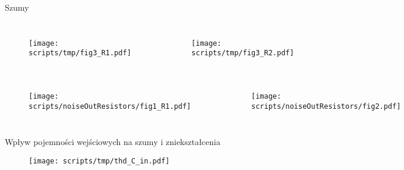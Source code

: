 \begin{frame}{Szumy}
    \begin{columns}
        \begin{figure}[H]
            \centering
            \texttt{[image: scripts/tmp/fig3\_R1.pdf]}
        \end{figure}
        \begin{figure}[H]
            \centering
            \texttt{[image: scripts/tmp/fig3\_R2.pdf]}
        \end{figure}
    \end{columns}


    \begin{columns}
        \begin{figure}[H]
            \centering
            \texttt{[image: scripts/noiseOutResistors/fig1\_R1.pdf]}
        \end{figure}
        \begin{figure}[H]
            \centering
            \texttt{[image: scripts/noiseOutResistors/fig2.pdf]}
        \end{figure}
    \end{columns}


\end{frame}


\begin{frame}{Wpływ pojemności wejściowych na szumy i zniekształcenia}
    \begin{figure}[H]
        \centering
        \texttt{[image: scripts/tmp/thd\_C\_in.pdf]} 
    \end{figure}

\end{frame}

